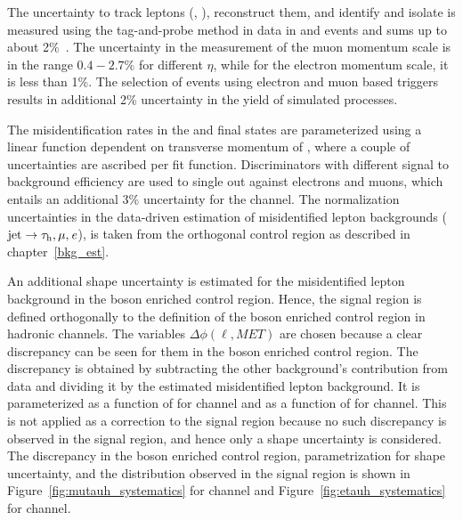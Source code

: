 The uncertainty to track leptons (\Pe, \Pgm), reconstruct them, and identify and isolate is measured using the tag-and-probe method in data in \Zee and \Zmm events and sums up to about 2\%~\cite{Chatrchyan:2012xi, Khachatryan:2015hwa, Khachatryan:2015dfa, CMS:2016gvn}. The uncertainty in the measurement of the muon momentum scale is in the range $0.4-2.7\%$ for different $\eta$, while for the electron momentum scale, it is less than 1\%. The selection of events using electron and muon based triggers results in additional 2\% uncertainty in the yield of simulated processes.

The misidentification rates in the  \ehad and \muhad final states are parameterized using a linear function dependent on transverse momentum of \tauh, where a couple of uncertainties are ascribed per fit function. Discriminators with different signal to background efficiency are used to single out \tauh against electrons and muons, which entails an additional 3\% uncertainty for the \ehad channel. The normalization uncertainties in the data-driven estimation of misidentified lepton backgrounds ($\text{jet}\to\tau_{\text{h}}, \mu, \textit{e}$), is taken from the orthogonal control region as described in chapter~\ref{bkg_est}.

An additional shape uncertainty is estimated for the misidentified lepton background in the \PW boson enriched control region. Hence, the signal region is defined orthogonally to the definition of the \PW boson enriched control region in hadronic channels. The variables $\Delta\phi(\ell, MET)$ are chosen because a clear discrepancy can be seen for them in the \PW boson enriched control region. The discrepancy is obtained by subtracting the other background's contribution from data and dividing it by the estimated misidentified lepton background. It is parameterized as a function of \dphimmet for \muhad channel and as a function of \dphiemet for \ehad channel. This is not applied as a correction to the signal region because no such discrepancy is observed in the signal region, and hence only a shape uncertainty is considered. The discrepancy in the \PW boson enriched control region, parametrization for shape uncertainty, and the distribution observed in the signal region is shown in Figure~\ref{fig:mutauh_systematics} for \Hmuhad channel and Figure~\ref{fig:etauh_systematics} for \Hehad channel.

